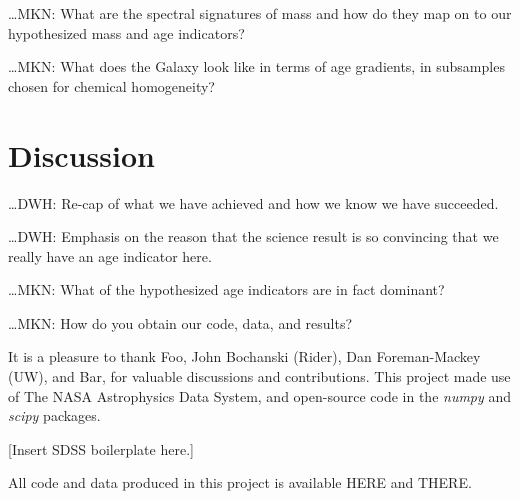 \documentclass[12pt, preprint]{aastex}
\newcommand{\project}[1]{\textsl{#1}}
\begin{document}

\ldots MKN: What are the spectral signatures of mass and how do they
map on to our hypothesized mass and age indicators?


\ldots MKN: What does the Galaxy look like in terms of age gradients,
in subsamples chosen for chemical homogeneity?

\section{Discussion}

\ldots DWH: Re-cap of what we have achieved and how we know we have
succeeded.

\ldots DWH: Emphasis on the reason that the science result is so
convincing that we really have an age indicator here.

\ldots MKN: What of the hypothesized age indicators are in fact
dominant?

\ldots MKN: How do you obtain our code, data, and results?

\acknowledgments
It is a pleasure to thank
  Foo,
  John Bochanski (Rider),
  Dan Foreman-Mackey (UW), and
  Bar,
for valuable discussions and contributions.
This project made use of
  The NASA Astrophysics Data System,
  and open-source code in the \project{numpy} and \project{scipy} packages.

[Insert SDSS boilerplate here.]

All code and data produced in this project is available HERE and THERE.


\end{document}
